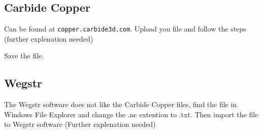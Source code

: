 \subsection{Carbide Copper}
Can be found at \verb|copper.carbide3d.com|.
Upload you file and follow the steps (further explenation needed)

Save the file.
\subsection{Wegstr}
The Wegstr software does not like the Carbide Copper files, find the file in Windows File Explorer and change the .nc extention to .txt. Then import the file to Wegstr software (Further explenation needed)

